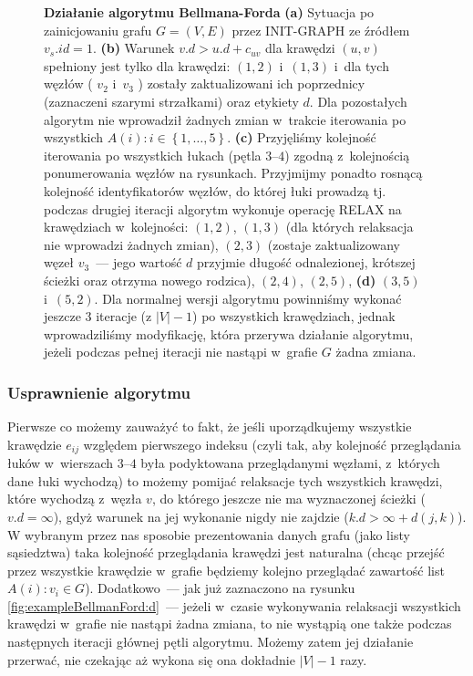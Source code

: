 \begin{figure}[!htbp]
	\caption{\textbf{Działanie algorytmu Bellmana-Forda} \textbf{(a)} Sytuacja po zainicjowaniu grafu $G = \left( V, E \right)$ przez \textsf{INIT-GRAPH} ze źródłem $v_{s}.id = 1$. \textbf{(b)} Warunek $ v.d > u.d + c_{uv} $ dla krawędzi $ \left( u, v \right) $ spełniony jest tylko dla krawędzi: $ \left( 1, 2 \right) $ i~$ \left( 1, 3 \right) $ i~dla tych węzłów ( $v_{2}$ i~$v_{3}$ ) zostały zaktualizowani ich poprzednicy (zaznaczeni szarymi strzałkami) oraz etykiety $d$. Dla pozostałych algorytm nie wprowadził żadnych zmian w~trakcie iterowania po wszystkich $ A \left( i \right) : i \in \left\{ 1, \ldots, 5\right\}$. \textbf{(c)} Przyjęliśmy kolejność iterowania po wszystkich łukach (pętla $3$--$4$) zgodną z~kolejnością ponumerowania węzłów na rysunkach. Przyjmijmy ponadto rosnącą kolejność identyfikatorów węzłów, do której łuki prowadzą tj. podczas drugiej iteracji algorytm wykonuje operację \textsf{RELAX} na krawędziach w~kolejności: $ \left( 1, 2 \right) $, $ \left( 1, 3 \right) $ (dla których relaksacja nie wprowadzi żadnych zmian), $ \left( 2, 3 \right) $ (zostaje zaktualizowany węzeł $v_{3}$~---  jego wartość $d$ przyjmie długość odnalezionej, krótszej ścieżki oraz otrzyma nowego rodzica), $ \left( 2, 4 \right) $, $ \left( 2, 5 \right) $, \textbf{(d)} $ \left( 3, 5 \right) $ i~$ \left( 5, 2 \right) $. Dla normalnej wersji algorytmu powinniśmy wykonać jeszcze 3 iteracje (z $ \left| V \right| - 1 $) po wszystkich krawędziach, jednak wprowadziliśmy modyfikację, która przerywa działanie algorytmu, jeżeli podczas pełnej iteracji nie nastąpi w~grafie $G$ żadna zmiana.} \label{fig:exampleBellmanFord}
\end{figure}

\subsubsection{Usprawnienie algorytmu}

Pierwsze co możemy zauważyć to fakt, że jeśli uporządkujemy wszystkie krawędzie $e_{ij}$ względem pierwszego indeksu (czyli tak, aby kolejność przeglądania łuków w~wierszach $3$--$4$ była podyktowana przeglądanymi węzłami, z~których dane łuki wychodzą) to możemy pomijać relaksacje tych wszystkich krawędzi, które wychodzą z~węzła $v$, do którego jeszcze nie ma wyznaczonej ścieżki ($v.d = \infty$), gdyż warunek na jej wykonanie nigdy nie zajdzie ($ k.d > \infty + d \left( j, k \right)$). W wybranym przez nas sposobie prezentowania danych grafu (jako listy sąsiedztwa) taka kolejność przeglądania krawędzi jest naturalna (chcąc przejść przez wszystkie krawędzie w~grafie będziemy kolejno przeglądać zawartość list $ A \left( i \right) : v_{i} \in G$). Dodatkowo~---  jak już zaznaczono na rysunku \ref{fig:exampleBellmanFord:d}~---  jeżeli w~czasie wykonywania relaksacji wszystkich krawędzi w~grafie nie nastąpi żadna zmiana, to nie wystąpią one także podczas następnych iteracji głównej pętli algorytmu. Możemy zatem jej działanie przerwać, nie czekając aż wykona się ona dokładnie $ \left| V \right| - 1$ razy.

